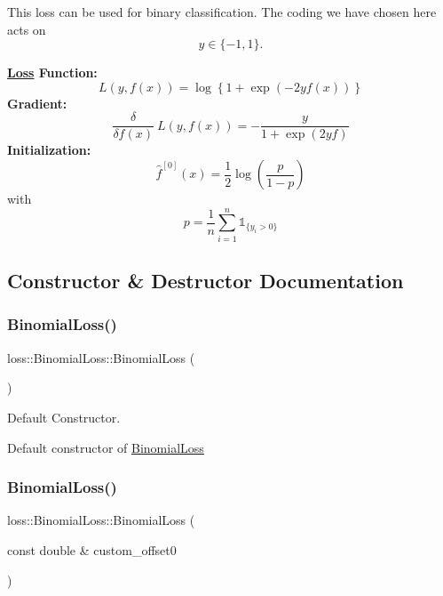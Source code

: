 This loss can be used for binary classification. The coding we have chosen here acts on \[ y \in \{-1, 1\}. \]

{\bfseries \hyperlink{classloss_1_1_loss}{Loss} Function\+:} \[ L(y, f(x)) = \log\left\{1 + \exp\left(-2yf(x)\right)\right\} \] {\bfseries Gradient\+:} \[ \frac{\delta}{\delta f(x)}\ L(y, f(x)) = - \frac{y}{1 + \exp\left(2yf\right)} \] {\bfseries Initialization\+:} \[ \hat{f}^{[0]}(x) = \frac{1}{2}\log\left(\frac{p}{1 - p}\right) \] with \[ p = \frac{1}{n}\sum\limits_{i=1}^n\mathbb{1}_{\{y_i > 0\}} \] 

\subsection{Constructor \& Destructor Documentation}
\mbox{\label{classloss_1_1_binomial_loss_ab903b1364d0569c83b4f44d8c7af0f69}} 
\subsubsection{\texorpdfstring{Binomial\+Loss()}{BinomialLoss()}\hspace{0.1cm}{\footnotesize\ttfamily [1/2]}}
{\footnotesize\ttfamily loss\+::\+Binomial\+Loss\+::\+Binomial\+Loss (\begin{DoxyParamCaption}{ }\end{DoxyParamCaption})}



Default Constructor. 

Default constructor of {\ttfamily \hyperlink{classloss_1_1_binomial_loss}{Binomial\+Loss}} \mbox{\label{classloss_1_1_binomial_loss_aac60ad4791933f54fb9858e8d89ba6a5}} 
\subsubsection{\texorpdfstring{Binomial\+Loss()}{BinomialLoss()}\hspace{0.1cm}{\footnotesize\ttfamily [2/2]}}
{\footnotesize\ttfamily loss\+::\+Binomial\+Loss\+::\+Binomial\+Loss (\begin{DoxyParamCaption}\item[{const double \&}]{custom\+\_\+offset0 }\end{DoxyParamCaption})}



